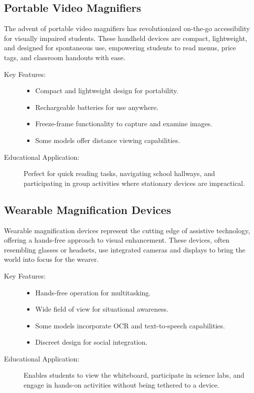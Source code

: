 \subsection{Portable Video Magnifiers}
The advent of portable video magnifiers has revolutionized on-the-go accessibility for visually impaired students. These handheld devices are compact, lightweight, and designed for spontaneous use, empowering students to read menus, price tags, and classroom handouts with ease.\supercite{AFBMagnification}

\begin{description}
	\item[Key Features:]
	      \begin{itemize}
		      \item Compact and lightweight design for portability.
		      \item Rechargeable batteries for use anywhere.
		      \item Freeze-frame functionality to capture and examine images.
		      \item Some models offer distance viewing capabilities.
	      \end{itemize}
	\item[Educational Application:] Perfect for quick reading tasks, navigating school hallways, and participating in group activities where stationary devices are impractical.
\end{description}

\subsection{Wearable Magnification Devices}
Wearable magnification devices represent the cutting edge of assistive technology, offering a hands-free approach to visual enhancement. These devices, often resembling glasses or headsets, use integrated cameras and displays to bring the world into focus for the wearer.\supercite{envision, AFBMagnification}

\begin{description}
	\item[Key Features:]
	      \begin{itemize}
		      \item Hands-free operation for multitasking.
		      \item Wide field of view for situational awareness.
		      \item Some models incorporate OCR and text-to-speech capabilities.
		      \item Discreet design for social integration.
	      \end{itemize}
	\item[Educational Application:] Enables students to view the whiteboard, participate in science labs, and engage in hands-on activities without being tethered to a device.
\end{description}

